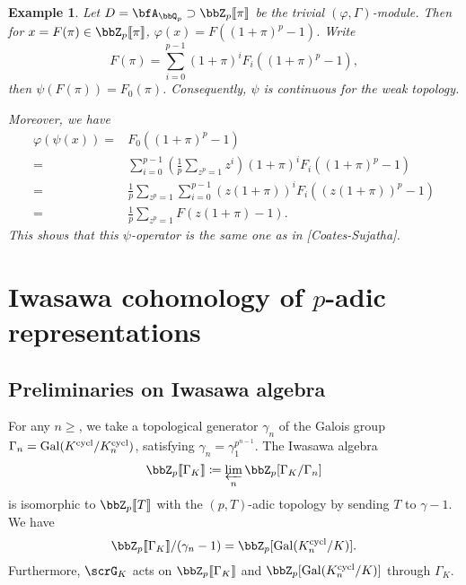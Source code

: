 \documentclass[a4paper,oneside]{amsart}
\newtheorem{example}[theorem]{Example}
\numberwithin{equation}{section}
\numberwithin{figure}{section}
\begin{document}
\begin{example}
    Let $D=\bfA_{\bbQ_p}\supset \bbZ_p\llbracket \pi\rrbracket$ be the trivial $(\varphi,\Gamma)$-module. Then for $x=F(\pi)\in\bbZ_p\llbracket\pi\rrbracket$, $\varphi(x)=F((1+\pi)^p-1)$. Write
    $$F(\pi)=\sum_{i=0}^{p-1}(1+\pi)^i F_i((1+\pi)^p-1),$$
    then $\psi(F(\pi))=F_0(\pi)$. Consequently, $\psi$ is continuous for the weak topology.

    Moreover, we have
    \begin{equation}
        \begin{aligned}
            \varphi(\psi(x))= & F_0((1+\pi)^p-1)                                                                  \\
            =                 & \sum_{i=0}^{p-1}\left(\frac{1}{p}\sum_{z^p=1}z^i\right)(1+\pi)^i F_i((1+\pi)^p-1) \\
            =                 & \frac{1}{p}\sum_{z^p=1}\sum_{i=0}^{p-1}(z(1+\pi))^i F_i((z(1+\pi))^p-1)           \\
            =                 & \frac{1}{p}\sum_{z^p=1}F(z(1+\pi)-1).
        \end{aligned}
    \end{equation}
    This shows that this $\psi$-operator is the same one as in [Coates-Sujatha].
\end{example}


\section{Iwasawa cohomology of $p$-adic representations}
\subsection{Preliminaries on Iwasawa algebra}
For any $n\geq $, we take a topological generator $\gamma_n$ of the Galois group $\Gamma_n=\operatorname{Gal}(K^{\operatorname{cycl}}/K_n^{\operatorname{cycl}})$, satisfying $\gamma_n=\gamma_1^{p^{n-1}}$. The Iwasawa algebra
$$\bbZ_p\llbracket\Gamma_K\rrbracket\coloneqq \varprojlim_n \bbZ_p[\Gamma_K/\Gamma_n]$$
is isomorphic to $\bbZ_p\llbracket T\rrbracket$ with the $(p,T)$-adic topology by sending $T$ to $\gamma-1$. We have
$$\bbZ_p\llbracket \Gamma_K\rrbracket/(\gamma_n-1)=\bbZ_p[\opn{Gal}(K_n^{\opn{cycl}}/K)].$$
Furthermore, $\scrG_K$ acts on $\bbZ_p\llbracket\Gamma_K\rrbracket$ and $\bbZ_p[\opn{Gal}(K_n^{\opn{cycl}}/K)]$ through $\Gamma_K$.
\end{document}
